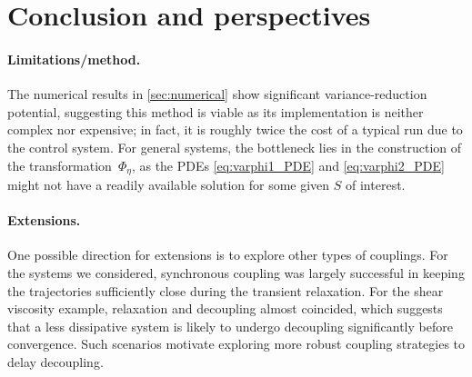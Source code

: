 \section{Conclusion and perspectives}
\label{sec:conclusion}
%
\paragraph{Limitations/method.} The numerical results in \cref{sec:numerical} show significant variance-reduction potential, suggesting this method is viable as its implementation is neither complex nor expensive; in fact, it is roughly twice the cost of a typical run due to the control system. For general systems, the bottleneck lies in the construction of the transformation~$\Phi_\eta$, as the PDEs \eqref{eq:varphi1_PDE} and \eqref{eq:varphi2_PDE} might not have a readily available solution for some given $S$ of interest. 

\paragraph{Extensions.} One possible direction for extensions is to explore other types of couplings. For the systems we considered, synchronous coupling was largely successful in keeping the trajectories sufficiently close during the transient relaxation. For the shear viscosity example, relaxation and decoupling almost coincided, which suggests that a less dissipative system is likely to undergo decoupling significantly before convergence. Such scenarios motivate exploring more robust coupling strategies to delay decoupling.

